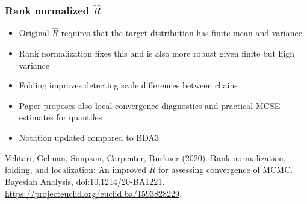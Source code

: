 \documentclass[finnish,english,t]{beamer}
\begin{document}
\begin{frame}[fragile]
  \frametitle{Rank normalized $\widehat{R}$}

  \begin{itemize}
  \item<+-> Original $\widehat{R}$ requires that the target distribution
    has finite mean and variance
  \item<+-> Rank normalization fixes this and is also more robust given
    finite but high variance
  \item<+-> Folding improves detecting scale differences between chains
  \item<+-> Paper proposes also local convergence diagnostics and
    practical MCSE estimates for quantiles
  \item<+-> Notation updated compared to BDA3 
  \end{itemize}  

  \vfill
  {\small\color{gray}
    Vehtari, Gelman, Simpson, Carpenter, Bürkner
  (2020). Rank-normalization, folding, and localization: An improved
  $\widehat{R}$ for assessing convergence of MCMC. Bayesian Analysis, doi:10.1214/20-BA1221. \url{https://projecteuclid.org/euclid.ba/1593828229}.}

\end{frame}

  




\end{document}
